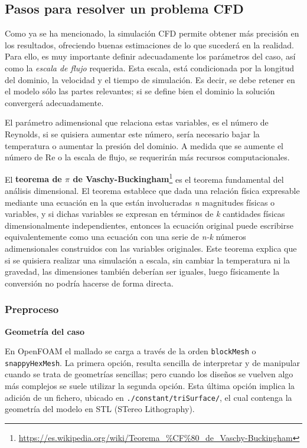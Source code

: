 \subsection{Pasos para resolver un problema CFD}\label{header-n114}

Como ya se ha mencionado, la simulación CFD permite obtener más
precisión en los resultados, ofreciendo buenas estimaciones de lo que
sucederá en la realidad. Para ello, es muy importante definir
adecuadamente los parámetros del caso, así como la \emph{escala de
flujo} requerida. Esta escala, está condicionada por la longitud del
dominio, la velocidad y el tiempo de simulación. Es decir, se debe
retener en el modelo sólo las partes relevantes; si se define bien el
dominio la solución convergerá adecuadamente.

El parámetro adimensional que relaciona estas variables, es el número de
Reynolds, si se quisiera aumentar este número, sería necesario bajar la
temperatura o aumentar la presión del dominio. A medida que se aumente
el número de Re o la escala de flujo, se requerirán más recursos
computacionales.

El \textbf{teorema de \(\pi\) de Vaschy-Buckingham}\footnote{\url{https://es.wikipedia.org/wiki/Teorema_\%CF\%80_de_Vaschy-Buckingham}}
es el teorema fundamental del análisis dimensional. El teorema establece
que dada una relación física expresable mediante una ecuación en la que
están involucradas \emph{n} magnitudes físicas o variables, y si dichas
variables se expresan en términos de \emph{k} cantidades físicas
dimensionalmente independientes, entonces la ecuación original puede
escribirse equivalentemente como una ecuación con una serie de
\emph{n-k} números adimensionales construidos con las variables
originales. Este teorema explica que si se quisiera realizar una
simulación a escala, sin cambiar la temperatura ni la gravedad, las
dimensiones también deberían ser iguales, luego físicamente la conversión no podría hacerse de forma directa.

\subsubsection{Preproceso}\label{header-n123}

\textbf{Geometría del caso}

En OpenFOAM el mallado se carga a través de la orden
\lstinline[style=bash]{blockMesh}
o \lstinline[style=bash]{snappyHexMesh}.
La primera opción, resulta sencilla de interpretar y de manipular cuando
se trata de geometrías sencillas; pero cuando los diseños se vuelven
algo más complejos se suele utilizar la segunda opción. Esta última
opción implica la adición de un fichero, ubicado en
\lstinline[style=bash]{./constant/triSurface/}, el cual contenga la
geometría del modelo en STL (STereo Lithography).

